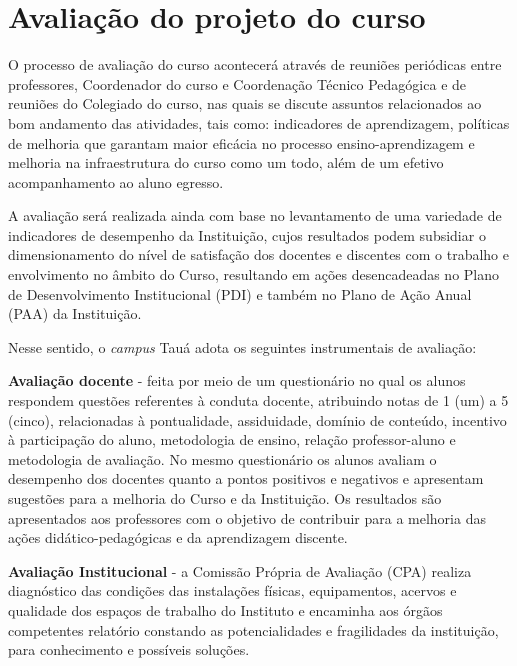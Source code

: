 \documentclass[
	12pt,				%
	openright,			%
	twoside,			%
	a4paper,			%
	chapter=TITLE,		%
	english,			%
	french,				%
	spanish,			%
	brazil,				%
	]{abntex2}
\begin{document}
\chapter{Avaliação do projeto do curso}


O processo de avaliação do curso acontecerá através de reuniões periódicas entre professores, Coordenador do curso e Coordenação Técnico Pedagógica e de reuniões do Colegiado do curso, nas quais se discute assuntos relacionados ao bom andamento das atividades, tais como: indicadores de aprendizagem, políticas de melhoria que garantam maior eficácia no processo ensino-aprendizagem e melhoria na infraestrutura do curso como um todo, além de um efetivo acompanhamento ao aluno egresso.

A avaliação será realizada ainda com base no levantamento de uma variedade de indicadores de desempenho da Instituição, cujos resultados podem subsidiar o dimensionamento do nível de satisfação dos docentes e discentes com o trabalho e envolvimento no âmbito do Curso, resultando em ações desencadeadas no Plano de Desenvolvimento Institucional (PDI) e também no Plano de Ação Anual (PAA) da Instituição.

Nesse sentido, o \textit{campus} Tauá adota os seguintes instrumentais de avaliação:
\begin{alineas}
		\item \textbf{Avaliação docente} - feita por meio de um questionário no qual os alunos respondem questões referentes à conduta docente, atribuindo notas de 1 (um) a 5 (cinco), relacionadas à pontualidade, assiduidade, domínio de conteúdo, incentivo à participação do aluno, metodologia de ensino, relação professor-aluno e metodologia de avaliação.  No mesmo questionário os alunos avaliam o desempenho dos docentes quanto a pontos positivos e negativos e apresentam sugestões para a melhoria do Curso e da Instituição. Os resultados são apresentados aos professores com o objetivo de contribuir para a melhoria das ações didático-pedagógicas e da aprendizagem discente.
	\item \textbf{Avaliação Institucional} - a Comissão Própria de Avaliação (CPA) realiza diagnóstico das condições das instalações físicas, equipamentos, acervos e qualidade dos espaços de trabalho do Instituto e encaminha aos órgãos competentes relatório constando as potencialidades e fragilidades da instituição, para conhecimento e possíveis soluções.

\end{alineas}
\end{document}
